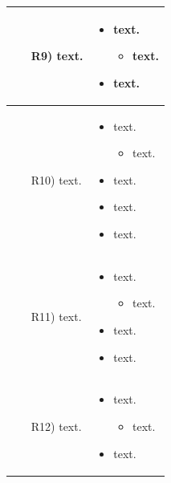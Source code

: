 \documentclass[table, 12pt]{article}
\begin{document}
\begin{longtable}{|p{}|p{}|}
    \begin{itemize}
        \item[R9)] text.
    \end{itemize}
    &
    \begin{itemize}
        \item text.
        \begin{itemize}
            \item text.
        \end{itemize}
        \item text.
    \end{itemize}
    \\\hline

    \begin{itemize}
        \item[R10)] text.
    \end{itemize}
    &
    \begin{itemize}
        \item text.
        \begin{itemize}
            \item text.
        \end{itemize}
        \item text.
        \item text.
        \item text.
    \end{itemize}
    \\\hline

    \begin{itemize}
        \item[R11)] text.
    \end{itemize}
    &
    \begin{itemize}
        \item text.
        \begin{itemize}
            \item text.
        \end{itemize}
        \item text.
        \item text.
    \end{itemize}
    \\\hline

    \begin{itemize}
        \item[R12)] text.
    \end{itemize}
    &
    \begin{itemize}
        \item text.
        \begin{itemize}
            \item text.
        \end{itemize}
        \item text.
    \end{itemize}
    \\\hline


\end{longtable}
\end{document}
